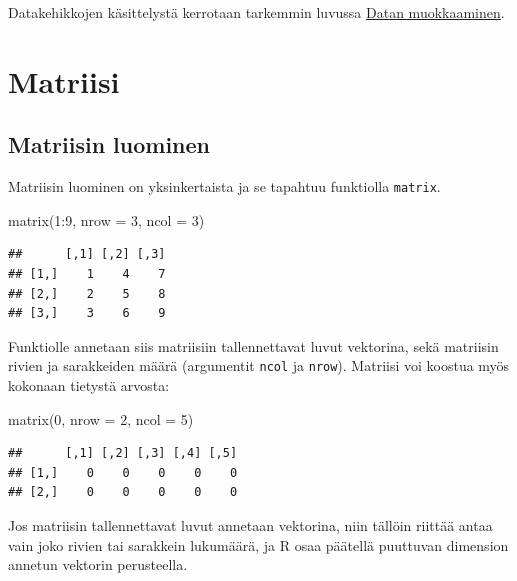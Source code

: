\documentclass[
]{book}
\newenvironment{Shaded}{\begin{snugshade}}{\end{snugshade}}
\newcommand{\AttributeTok}[1]{\textcolor[rgb]{0.77,0.63,0.00}{#1}}
\newcommand{\DecValTok}[1]{\textcolor[rgb]{0.00,0.00,0.81}{#1}}
\newcommand{\FunctionTok}[1]{\textcolor[rgb]{0.00,0.00,0.00}{#1}}
\newcommand{\NormalTok}[1]{#1}
\newcommand{\SpecialCharTok}[1]{\textcolor[rgb]{0.00,0.00,0.00}{#1}}
\begin{document}
Datakehikkojen käsittelystä kerrotaan tarkemmin luvussa \protect\hyperlink{data-frame-wrangling}{Datan muokkaaminen}.

\hypertarget{matrix}{%
\section{Matriisi}\label{matrix}}

\hypertarget{matriisin-luominen}{%
\subsection{Matriisin luominen}\label{matriisin-luominen}}

Matriisin luominen on yksinkertaista ja se tapahtuu funktiolla \texttt{matrix}.

\begin{Shaded}
\begin{Highlighting}[]
\FunctionTok{matrix}\NormalTok{(}\DecValTok{1}\SpecialCharTok{:}\DecValTok{9}\NormalTok{, }\AttributeTok{nrow =} \DecValTok{3}\NormalTok{, }\AttributeTok{ncol =} \DecValTok{3}\NormalTok{)}
\end{Highlighting}
\end{Shaded}

\begin{verbatim}
##      [,1] [,2] [,3]
## [1,]    1    4    7
## [2,]    2    5    8
## [3,]    3    6    9
\end{verbatim}

Funktiolle annetaan siis matriisiin tallennettavat luvut vektorina, sekä matriisin rivien ja sarakkeiden määrä (argumentit \texttt{ncol} ja \texttt{nrow}). Matriisi voi koostua myös kokonaan tietystä arvosta:

\begin{Shaded}
\begin{Highlighting}[]
\FunctionTok{matrix}\NormalTok{(}\DecValTok{0}\NormalTok{, }\AttributeTok{nrow =} \DecValTok{2}\NormalTok{, }\AttributeTok{ncol =} \DecValTok{5}\NormalTok{)}
\end{Highlighting}
\end{Shaded}

\begin{verbatim}
##      [,1] [,2] [,3] [,4] [,5]
## [1,]    0    0    0    0    0
## [2,]    0    0    0    0    0
\end{verbatim}

Jos matriisin tallennettavat luvut annetaan vektorina, niin tällöin riittää antaa vain joko rivien tai sarakkein lukumäärä, ja R osaa päätellä puuttuvan dimension annetun vektorin perusteella.
\end{document}
